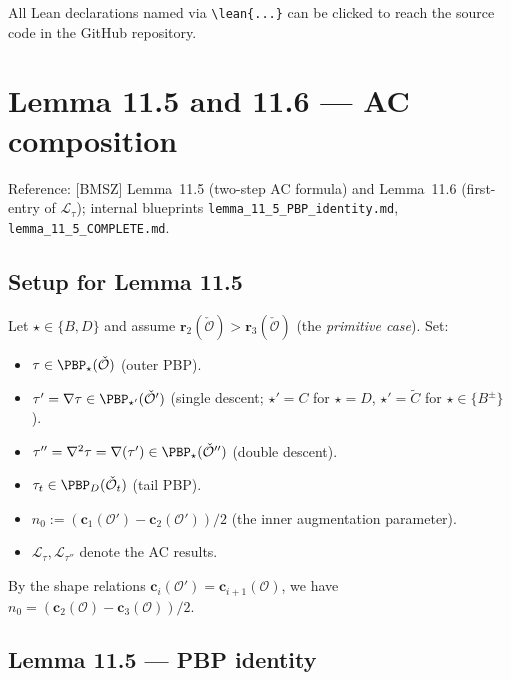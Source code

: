 All Lean declarations named via \texttt{\textbackslash lean\{...\}} can be
clicked to reach the source code in the GitHub repository.


\chapter{Lemma 11.5 and 11.6 — AC composition}
\label{chap:11_5}

Reference: [BMSZ] Lemma~11.5 (two-step AC formula) and Lemma~11.6 (first-entry
of $\mathcal{L}_\tau$); internal blueprints
\texttt{lemma\_11\_5\_PBP\_identity.md}, \texttt{lemma\_11\_5\_COMPLETE.md}.

\section{Setup for Lemma 11.5}

Let $\star \in \{B, D\}$ and assume $\mathbf{r}_2(\check{\mathcal{O}}) > \mathbf{r}_3(\check{\mathcal{O}})$
(the \emph{primitive case}). Set:
\begin{itemize}
  \item $\tau \in \PBP_\star(\check{\mathcal{O}})$ (outer PBP).
  \item $\tau' = \nabla\tau \in \PBP_{\star'}(\check{\mathcal{O}}')$ (single descent; $\star' = C$ for $\star = D$, $\star' = \tilde{C}$ for $\star \in \{B^\pm\}$).
  \item $\tau'' = \nabla^2\tau = \nabla(\tau') \in \PBP_\star(\check{\mathcal{O}}'')$ (double descent).
  \item $\tau_t \in \PBP_D(\check{\mathcal{O}}_t)$ (tail PBP).
  \item $n_0 := (\mathbf{c}_1(\mathcal{O}') - \mathbf{c}_2(\mathcal{O}')) / 2$ (the inner augmentation parameter).
  \item $\mathcal{L}_\tau, \mathcal{L}_{\tau''}$ denote the AC results.
\end{itemize}

By the shape relations $\mathbf{c}_i(\mathcal{O}') = \mathbf{c}_{i+1}(\mathcal{O})$, we have
$n_0 = (\mathbf{c}_2(\mathcal{O}) - \mathbf{c}_3(\mathcal{O}))/2$.

\section{Lemma 11.5 — PBP identity}

